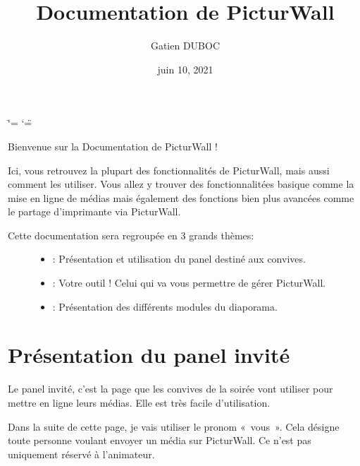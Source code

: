 \documentclass[letterpaper,10pt,french]{sphinxmanual}
\title{Documentation de PicturWall}
\date{juin 10, 2021}
\author{Gatien DUBOC}
\begin{document}
\ifdefined\shorthandoff
  \ifnum\catcode`\=\string=\active\shorthandoff{=}\fi
  \ifnum\catcode`\"=\active{}\fi
\fi

\pagestyle{empty}
\sphinxmaketitle
\pagestyle{plain}
\sphinxtableofcontents
\pagestyle{normal}
\label{\detokenize{index::doc}}


\sphinxAtStartPar
Bienvenue sur la Documentation de PicturWall !

\sphinxAtStartPar
Ici, vous retrouvez la plupart des fonctionnalités de PicturWall, mais aussi comment les utiliser. Vous allez y trouver des fonctionnalitées basique comme la mise en ligne de médias mais également des fonctions bien plus avancées comme le partage d’imprimante via PicturWall.
\begin{description}
\item[{Cette documentation sera regroupée en 3 grands thèmes:}] \leavevmode\begin{itemize}
\item {} 
\sphinxAtStartPar
{\hyperref[\detokenize{panel_invite/index:panel-invite}]{}}: Présentation et utilisation du panel destiné aux convives.

\item {} 
\sphinxAtStartPar
{}: Votre outil ! Celui qui va vous permettre de gérer PicturWall.

\item {} 
\sphinxAtStartPar
{}: Présentation des différents modules du diaporama.

\end{itemize}

\end{description}


\chapter{Présentation du panel invité}
\label{\detokenize{panel_invite/index:presentation-du-panel-invite}}\label{\detokenize{panel_invite/index:panel-invite}}\label{\detokenize{panel_invite/index::doc}}
\sphinxAtStartPar
Le panel invité, c’est la page que les convives de la soirée vont utiliser pour mettre en ligne leurs médias.
Elle est très facile d’utilisation.

\sphinxAtStartPar
Dans la suite de cette page, je vais utiliser le pronom « vous ». Cela désigne toute personne voulant envoyer un média sur PicturWall. Ce n’est pas uniquement réservé à l’animateur.
\end{document}

